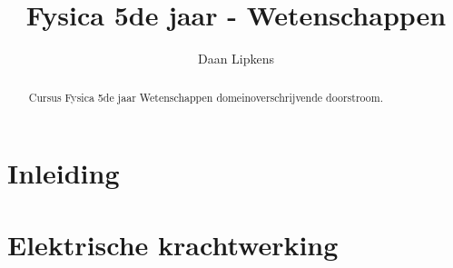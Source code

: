 \documentclass[nonewpage]{xourse}
\title{Fysica 5de jaar - Wetenschappen}
\author{Daan Lipkens}
\begin{document}
\begin{abstract}
    Cursus Fysica 5de jaar Wetenschappen domeinoverschrijvende doorstroom.
\end{abstract}
\maketitle




\inleidingstart %
\part{Inleiding}
\inleidingstop
\chapterstyle
{}
\sectionstyle
{}


\part{Elektrische krachtwerking} %
\end{document}
